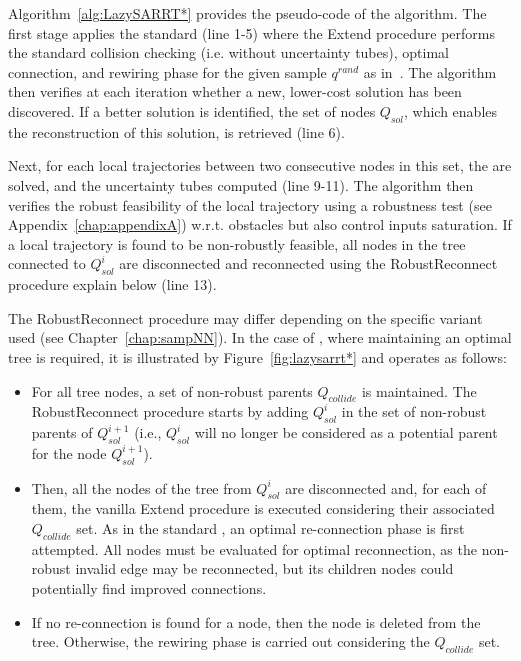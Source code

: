 Algorithm~\ref{alg:LazySARRT*} provides the pseudo-code of the  algorithm.
The first stage applies the standard  (line 1-5) where the Extend procedure performs the standard collision checking (i.e. without uncertainty tubes), optimal connection, and rewiring phase for the given sample  $q^{rand}$ as in~\cite{cRRTstar}.
The algorithm then verifies at each iteration whether a new, lower-cost solution has been discovered. 
If a better solution is identified, the set of nodes $Q_{sol}$, which enables the reconstruction of this solution, is retrieved (line 6).

Next, for each local trajectories between two consecutive nodes in this set, the  are solved, and the uncertainty tubes computed (line 9-11).
The algorithm then verifies the robust feasibility of the local trajectory using a robustness test (see Appendix~\ref{chap:appendixA}) w.r.t. obstacles but also control inputs saturation. 
If a local trajectory is found to be non-robustly feasible, all nodes in the tree connected to $Q_{sol}^i$ are disconnected and reconnected using the RobustReconnect procedure explain below (line 13).

The RobustReconnect procedure may differ depending on the specific  variant used (see Chapter~\ref{chap:sampNN}). 
In the case of , where maintaining an optimal tree is required, it is illustrated by Figure~\ref{fig:lazysarrt*} and operates as follows:
\begin{itemize}
    \item For all tree nodes, a set of non-robust parents $Q_{collide}$ is maintained. 
    The RobustReconnect procedure starts by adding $Q_{sol}^i$ in the set of non-robust parents of $Q_{sol}^{i+1}$ (i.e., $Q_{sol}^i$ will no longer be considered as a potential parent for the node $Q_{sol}^{i+1}$).
    \item Then, all the nodes of the tree from $Q_{sol}^i$ are disconnected and, for each of them, the vanilla Extend procedure is executed considering their associated $Q_{collide}$ set.
    As in the standard , an optimal re-connection phase is first attempted.
    All nodes must be evaluated for optimal reconnection, as the non-robust invalid edge may be reconnected, but its children nodes could potentially find improved connections.
    \item If no re-connection is found for a node, then the node is deleted from the tree. 
    Otherwise, the rewiring phase is carried out considering the $Q_{collide}$ set.
\end{itemize}


